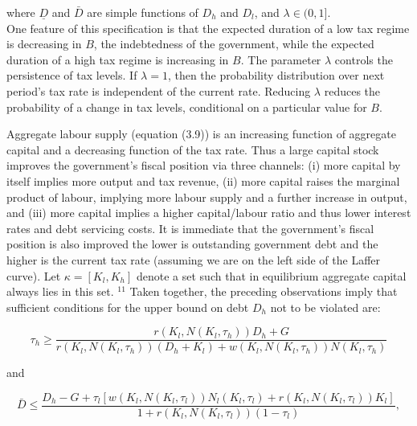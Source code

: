 \documentclass[11pt]{article}
\begin{document}
where $\underline{D}$ and $\bar{D}$ are simple functions of $D_{h}$ and $D_{l}$, and $\lambda \in(0,1]$.\\
One feature of this specification is that the expected duration of a low tax regime is decreasing in $B$, the indebtedness of the government, while the expected duration of a high tax regime is increasing in $B$. The parameter $\lambda$ controls the persistence of tax levels. If $\lambda=1$, then the probability distribution over next period's tax rate is independent of the current rate. Reducing $\lambda$ reduces the probability of a change in tax levels, conditional on a particular value for $B$.

Aggregate labour supply (equation (3.9)) is an increasing function of aggregate capital and a decreasing function of the tax rate. Thus a large capital stock improves the government's fiscal position via three channels: (i) more capital by itself implies more output and tax revenue, (ii) more capital raises the marginal product of labour, implying more labour supply and a further increase in output, and (iii) more capital implies a higher capital/labour ratio and thus lower interest rates and debt servicing costs. It is immediate that the government's fiscal position is also improved the lower is outstanding government debt and the higher is the current tax rate (assuming we are on the left side of the Laffer curve). Let $\kappa=\left[K_{l}, K_{h}\right]$ denote a set such that in equilibrium aggregate capital always lies in this set. ${ }^{11}$ Taken together, the preceding observations imply that sufficient conditions for the upper bound on debt $D_{h}$ not to be violated are:


\begin{equation*}
\tau_{h} \geq \frac{r\left(K_{l}, N\left(K_{l}, \tau_{h}\right)\right) D_{h}+G}{r\left(K_{l}, N\left(K_{l}, \tau_{h}\right)\right)\left(D_{h}+K_{l}\right)+w\left(K_{l}, N\left(K_{l}, \tau_{h}\right)\right) N\left(K_{l}, \tau_{h}\right)} \tag{3.11}
\end{equation*}


and


\begin{equation*}
\bar{D} \leq \frac{D_{h}-G+\tau_{l}\left[w\left(K_{l}, N\left(K_{l}, \tau_{l}\right)\right) N_{l}\left(K_{l}, \tau_{l}\right)+r\left(K_{l}, N\left(K_{l}, \tau_{l}\right)\right) K_{l}\right]}{1+r\left(K_{l}, N\left(K_{l}, \tau_{l}\right)\right)\left(1-\tau_{l}\right)}, \tag{3.12}
\end{equation*}
\end{document}
